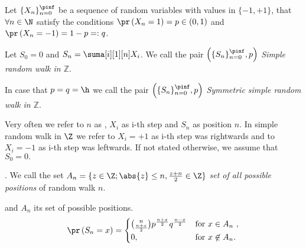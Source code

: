 \begin{defn}\label{defn-simple_random_walk_Z}
 Let $\{X_n\}_{n=0}^\pinf$ be a sequence of \iid random variables with values in $\{ -1, +1\}$, that $\forall n \in \N$ satisfy the conditions $\pr \left( X_n=1 \right) =p \in \left( 0,1 \right) $ and $\pr \left( X_n=-1 \right) =1-p=:q$.

 Let $S_0=0$ and $S_n=\suma[i][1][n]X_i$. We call the pair $ \left( \{S_n\}_{n=0}^\pinf, p \right) $ \emph{Simple random walk in $\mathbb{Z}$}.

 In case that $p=q=\h $ we call the pair $ \left( \{S_n\}_{n=0}^\pinf, p \right) $ \emph{Symmetric simple random walk in $\mathbb{Z}$}.
\end{defn}
\begin{rem}
 Very often we refer to $n$ as \Time, $X_i$ as i-th step and $S_n$ as position \intime $n$.
 In simple random walk in $\Z$ we refer to $X_i=+1$ as i-th step was rightwards and to $X_i=-1$ as i-th step was leftwards. If not stated otherwise, we assume that $S_0=0.$
\end{rem}

\begin{defn}\label{defn-set_all_possible_values}
 \Lrw. We call the set $A_n=\{z \in \Z; \abs{z}\leq n, \frac{z+n}{2}\in \Z \}$ \emph{set of all possible positions} of random walk \rw \intime $n$.
\end{defn}


\begin{thm}\label{thm-probability_position_time}
 \Lrw and $A_n$ its set of possible positions.
 \[
 \pr \left( S_n=x \right) =
 \begin{cases}
 \binom{n}{\frac{n+x}{2}}p^{\frac{n+x}{2}}q^{\frac{n-x}{2}} & \text{for $x \in A_n$ },\\
 0, & \text{for $x \not\in A_n$}.
 \end{cases}
 \]

\end{thm}

